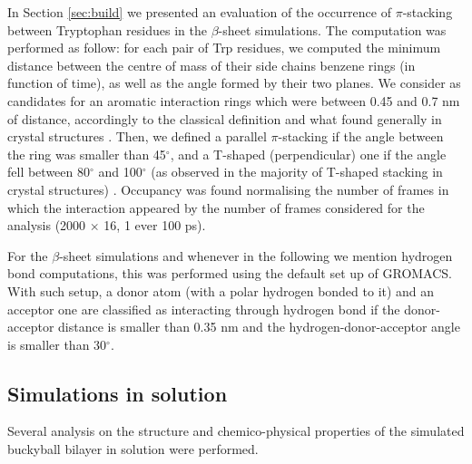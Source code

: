 In Section \ref{sec:build} we presented an evaluation of the occurrence of $\pi$-stacking between Tryptophan residues in the $\beta$-sheet simulations. The computation was performed as follow: for each pair of Trp residues, we computed the minimum distance between the centre of mass of their side chains benzene rings (in function of time), as well as the angle formed by their two planes. We consider as candidates for an aromatic interaction rings which were between 0.45 and 0.7 nm of distance, accordingly to the classical definition \citep{Burley1986} and what found generally in crystal structures \citep{Anjana2012}. 
%
Then, we defined a parallel $\pi$-stacking if the angle between the ring was smaller than 45$^{\circ}$, and a T-shaped (perpendicular) one if the angle fell between 80$^{\circ}$ and 100$^{\circ}$ (as observed in the majority of T-shaped stacking in crystal structures) \citep{Anjana2012}. Occupancy was found normalising the number of frames in which the interaction appeared by the number of frames considered for the analysis (2000 $\times$ 16, 1 ever 100 ps).    

For the $\beta$-sheet simulations and whenever in the following we mention hydrogen bond computations, this was performed using the default set up of GROMACS. With such setup, a donor atom (with a polar hydrogen bonded to it) and an acceptor one are classified as interacting through hydrogen bond if the donor-acceptor distance is smaller than 0.35 nm and the hydrogen-donor-acceptor angle is smaller than 30$^{\circ}$.
    
\subsection{Simulations in solution}
Several analysis on the structure and chemico-physical properties of the simulated buckyball bilayer in solution were performed.

